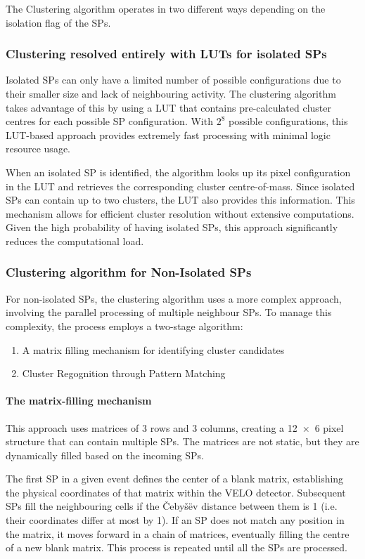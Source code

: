 The Clustering algorithm operates in two different ways depending on the isolation flag of the SPs.
\subsubsection{Clustering resolved entirely with LUTs for isolated SPs}
Isolated SPs can only have a limited number of possible configurations due to their smaller size and lack of neighbouring activity. The clustering algorithm takes advantage of this by using a LUT that contains pre-calculated cluster centres for each possible SP configuration. With $2^8$ possible configurations, this LUT-based approach provides extremely fast processing with minimal logic resource usage.

When an isolated SP is identified, the algorithm looks up its pixel configuration in the LUT and retrieves the corresponding cluster centre-of-mass. Since isolated SPs can contain up to two clusters, the LUT also provides this information. This mechanism allows for efficient cluster resolution without extensive computations. Given the high probability of having isolated SPs, this approach significantly reduces the computational load.

\subsubsection{Clustering algorithm for Non-Isolated SPs}
For non-isolated SPs, the clustering algorithm uses a more complex approach, involving the parallel processing of multiple neighbour SPs. To manage this complexity, the process employs a two-stage algorithm\cite{Lazzari:2813167}:
\begin{enumerate}
    \item A matrix filling mechanism for identifying cluster candidates
    \item Cluster Regognition through Pattern Matching
\end{enumerate}

\paragraph{The matrix-filling mechanism}
This approach uses matrices of 3 rows and 3 columns, creating a 12~×~6 pixel structure that can contain multiple SPs. The matrices are not static, but they are dynamically filled based on the incoming SPs.

The first SP in a given event defines the center of a blank matrix, establishing the physical coordinates of that matrix within the VELO detector. Subsequent SPs fill the neighbouring cells if the Čebyšëv distance between them is 1 (i.e. their coordinates differ at most by 1). If an SP does not match any position in the matrix, it moves forward in a chain of matrices, eventually filling the centre of a new blank matrix. This process is repeated until all the SPs are processed.

